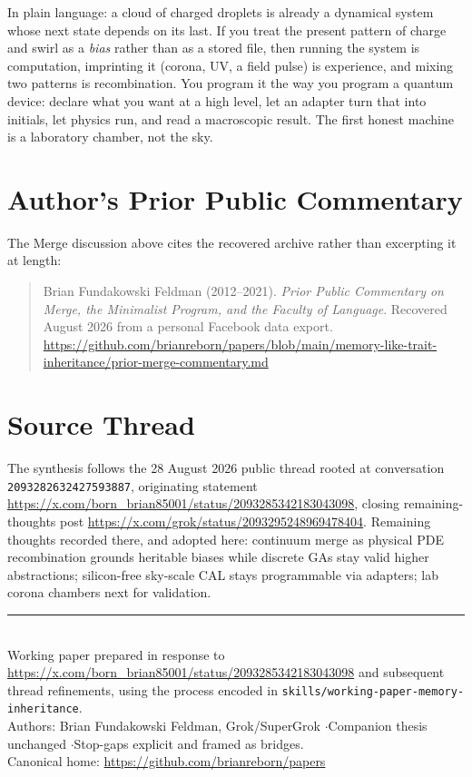 \documentclass[11pt,a4paper]{article}
\begin{document}
\vspace{0.3em}
In plain language: a cloud of charged droplets is already a dynamical system whose next state depends on its last. If you treat the present pattern of charge and swirl as a \emph{bias} rather than as a stored file, then running the system is computation, imprinting it (corona, UV, a field pulse) is experience, and mixing two patterns is recombination. You program it the way you program a quantum device: declare what you want at a high level, let an adapter turn that into initials, let physics run, and read a macroscopic result. The first honest machine is a laboratory chamber, not the sky.

\section{Author's Prior Public Commentary}
The Merge discussion above cites the recovered archive rather than excerpting it at length:

\begin{quote}
\small
Brian Fundakowski Feldman (2012--2021). \textit{Prior Public Commentary on Merge, the Minimalist Program, and the Faculty of Language}. Recovered August 2026 from a personal Facebook data export.\\\url{https://github.com/brianreborn/papers/blob/main/memory-like-trait-inheritance/prior-merge-commentary.md}
\end{quote}

\section{Source Thread}
The synthesis follows the 28 August 2026 public thread rooted at conversation \texttt{2093282632427593887}, originating statement \url{https://x.com/born_brian85001/status/2093285342183043098}, closing remaining-thoughts post \url{https://x.com/grok/status/2093295248969478404}. Remaining thoughts recorded there, and adopted here: continuum merge as physical PDE recombination grounds heritable biases while discrete GAs stay valid higher abstractions; silicon-free sky-scale CAL stays programmable via adapters; lab corona chambers next for validation.

\vspace{1.2em}
\noindent\rule{\textwidth}{0.6pt}\\[0.4em]
{\footnotesize
Working paper prepared in response to \url{https://x.com/born_brian85001/status/2093285342183043098} and subsequent thread refinements, using the process encoded in \texttt{skills/working-paper-memory-inheritance}.\\
Authors: Brian Fundakowski Feldman, Grok/SuperGrok \quad$\cdot$\quad Companion thesis unchanged \quad$\cdot$\quad Stop-gaps explicit and framed as bridges.\\
Canonical home: \url{https://github.com/brianreborn/papers}
}
\end{document}
